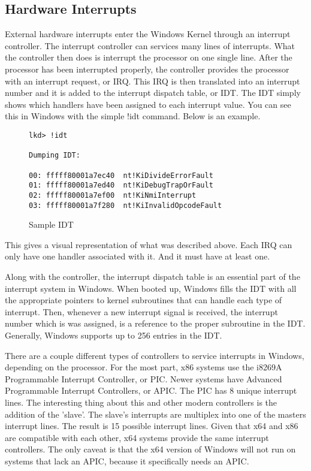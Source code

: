 \documentclass[letterpaper,10pt,titlepage,draftclsnofoot,onecolumn]{IEEEtran}
\begin{document}
\subsection{Hardware Interrupts}
External hardware interrupts enter the Windows Kernel through an interrupt controller. The interrupt controller can services many lines of interrupts. What the controller then does is interrupt the processor on one single line. After the processor has been interrupted properly, the controller provides the processor with an interrupt request, or IRQ. This IRQ is then translated into an interrupt number and it is added to the interrupt dispatch table, or IDT. \cite{windows} The IDT simply shows which handlers have been assigned to each interrupt value. You can see this in Windows with the simple !idt command. Below is an example.
\begin{figure}[H]
\caption{Sample IDT}
\begin{lstlisting}
lkd> !idt

Dumping IDT:

00: fffff80001a7ec40  nt!KiDivideErrorFault
01: fffff80001a7ed40  nt!KiDebugTrapOrFault
02: fffff80001a7ef00  nt!KiNmiInterrupt
03: fffff80001a7f280  nt!KiInvalidOpcodeFault
\end{lstlisting} \cite{windows}
\end{figure}

This gives a visual representation of what was described above. Each IRQ can only have one handler associated with it. And it must have at least one.

Along with the controller, the interrupt dispatch table is an essential part of the interrupt system in Windows. When booted up, Windows fills the IDT with all the appropriate pointers to kernel subroutines that can handle each type of interrupt. Then, whenever a new interrupt signal is received, the interrupt number which is was assigned, is a reference to the proper subroutine in the IDT. Generally, Windows supports up to 256 entries in the IDT. \cite{windows}


There are a couple different types of controllers to service interrupts in Windows, depending on the processor. For the most part, x86 systems use the i8269A Programmable Interrupt Controller, or PIC. Newer systems have Advanced Programmable Interrupt Controllers, or APIC. The PIC has 8 unique interrupt lines. The interesting thing about this and other modern controllers is the addition of the 'slave'. The slave's interrupts are multiplex into one of the masters interrupt lines. The result is 15 possible interrupt lines. Given that x64 and x86 are compatible with each other, x64 systems provide the same interrupt controllers. The only caveat is that the x64 version of Windows will not run on systems that lack an APIC, because it specifically needs an APIC. \cite{windows}
\end{document}
